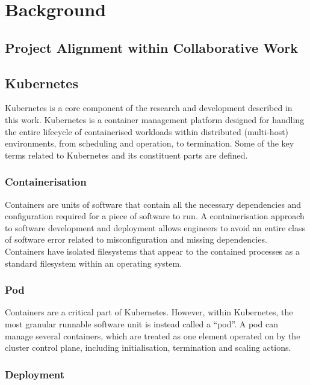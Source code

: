 \chapter{Background}

\section{Project Alignment within Collaborative Work}

\section{Kubernetes}

Kubernetes is a core component of the research and development described in this work. Kubernetes is a container management platform designed for handling the entire lifecycle of containerised workloads within distributed (multi-host) environments, from scheduling and operation, to termination. Some of the key terms related to Kubernetes and its constituent parts are defined.

\subsection{Containerisation}

Containers are units of software that contain all the necessary dependencies and configuration required for a piece of software to run. A containerisation approach to software development and deployment allows engineers to avoid an entire class of software error related to misconfiguration and missing dependencies. Containers have isolated filesystems that appear to the contained processes as a standard filesystem within an operating system.

\subsection{Pod}

Containers are a critical part of Kubernetes. However, within Kubernetes, the most granular runnable software unit is instead called a “pod”. A pod can manage several containers, which are treated as one element operated on by the cluster control plane, including initialisation, termination and scaling actions.

\subsection{Deployment}


